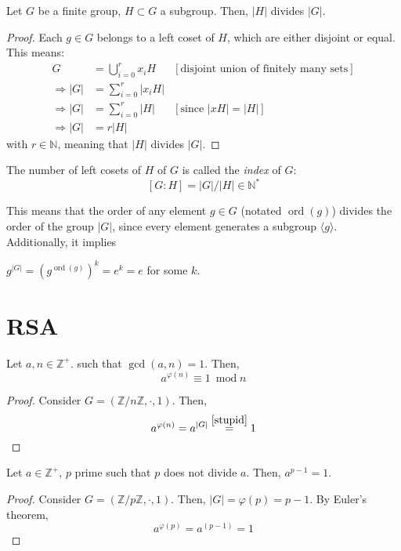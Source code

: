 \begin{theorem}[Lagrange]
  Let $G$ be a finite group, $H \subset G$ a subgroup. Then, $|H|$ divides $|G|$.
\end{theorem}
\begin{proof}
  Each $g \in G$ belongs to a left coset of $H$, which are either disjoint or equal. This means:
  \begin{align*}
    G &= \bigcup_{i = 0}^{r}x_iH &[\text{disjoint union of finitely many sets}] \\
    \Rightarrow |G| &= \sum_{i = 0}^r |x_iH| &\\
    \Rightarrow |G| &= \sum_{i = 0}^r |H| &[\text{since } |xH| = |H|] \\
    \Rightarrow |G| &= r|H| &
  \end{align*}
  with $r \in \mathbb{N}$, meaning that $|H|$ divides $|G|$. 
\end{proof}

\begin{definition}
  The number of left cosets of $H$ of $G$ is called the \emph{index} of $G$: 
  \[
    [G : H] = |G|/|H| \in \mathbb{N}^*
  \]
\end{definition}

This means that the order of any element $g \in G$ (notated $\operatorname{ord}(g)$) divides the order of the group $|G|$, since every element generates a subgroup $\langle g \rangle$. Additionally, it implies 

\begin{corollary}\label{stupid}
  $g^{|G|} = (g^{\operatorname{ord}(g)})^{k} = e^k = e$ for some $k$.
\end{corollary}

\section{RSA}

\begin{theorem}
  Let $a, n \in \mathbb{Z}^+$. such that $\gcd(a, n) = 1$. Then, \[ a^{\varphi(n)} \equiv 1 \ \operatorname{mod} n\]
\end{theorem}
\begin{proof}
  Consider $G = (\mathbb{Z}/n\mathbb{Z}, \cdot, 1)$. Then, 
  \[
    a^{\varphi(n)} = a^{|G|} \stackrel{\ref{stupid}}{=} 1
  \]
\end{proof}

\begin{theorem}
  Let $a \in \mathbb{Z}^+$, $p$ prime such that $p$ does not divide $a$. Then, $a^{p - 1} = 1$. 
\end{theorem}
\begin{proof}
  Consider $G = (\mathbb{Z}/p\mathbb{Z}, \cdot, 1)$. Then, $|G| = \varphi(p) = p - 1$. By Euler's theorem, \[a^{\varphi(p)} = a^{(p - 1)} = 1\]
\end{proof}

